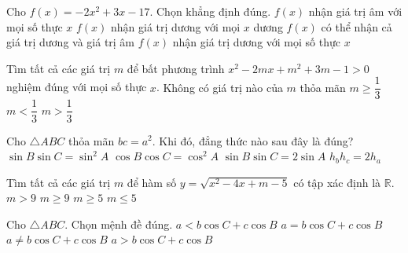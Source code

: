 \begin{ex}%
Cho $f(x)=-2x^2+3x-17$. Chọn khẳng định đúng.
\choice
{$f(x)$ nhận giá trị âm với mọi số thực $x$}
{$f(x)$ nhận giá trị dương với mọi $x$ dương}
{\True $f(x)$ có thể  nhận cả giá trị dương và giá trị âm}
{$f(x)$ nhận giá trị dương với mọi số thực $x$}
\end{ex}

\begin{ex}%
Tìm tất cả các giá trị $m$ để bất phương trình $x^2-2mx+m^2+3m-1>0$ nghiệm đúng với mọi số thực $x$.
\choice
{Không có giá trị nào của $m$ thỏa mãn}
{$m\geq\dfrac{1}{3}$}
{$m<\dfrac{1}{3}$}
{\True $m>\dfrac{1}{3}$}
\end{ex}
\begin{ex}%
Cho $\triangle ABC$ thỏa mãn $bc=a^2$. Khi  đó, đẳng thức nào sau đây là đúng?
\choice
{\True $\sin B \sin C= \sin^2 A$}
{$\cos B \cos C= \cos ^2 A$}
{$\sin B \sin C=2 \sin A$}
{$h_b h_c=2h_a$}
\end{ex}

\begin{ex}%
Tìm tất cả các giá trị $m$ để hàm số $y=\sqrt{x^2-4x+m-5}$ có tập xác định là $\mathbb{R}$.
\choice
{\True $m>9$}
{$m\geq 9$}
{$m\geq 5$}
{$m\leq 5$}
\end{ex}
\begin{ex}%
Cho $\triangle ABC$. Chọn mệnh đề đúng.
\choice
{$a<b\cos C+c\cos B$}
{\True $a=b\cos C +c\cos B$}
{$a \ne b\cos C+ c\cos B$}
{$a>b\cos C+c\cos B$}
\end{ex}

